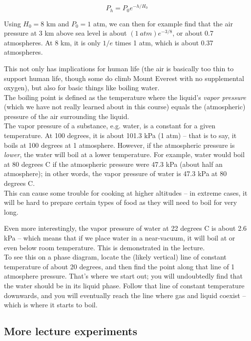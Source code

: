 \documentclass[8.01x]{subfiles}
\begin{document}
\begin{equation}
P_h = P_0 e^{- h/H_0}
\end{equation}

Using $H_0 = 8$ km and $P_0 = 1$ atm, we can then for example find that the air pressure at 3 km above sea level is about $(\SI{1}{atm})e^{-3/8}$, or about 0.7 atmospheres. At 8 km, it is only $1/e$ times 1 atm, which is about 0.37 atmospheres.

This not only has implications for human life (the air is basically too thin to support human life, though some do climb Mount Everest with no supplemental oxygen), but also for basic things like boiling water.\\
The boiling point is defined as the temperature where the liquid's \emph{vapor pressure} (which we have not really learned about in this course) equals the (atmospheric) pressure of the air surrounding the liquid.\\
The vapor pressure of a substance, e.g. water, is a constant for a given temperature. At 100 degrees, it is about 101.3 kPa (1 atm) -- that is to say, it boils at 100 degrees at 1 atmosphere. However, if the atmospheric pressure is \emph{lower}, the water will boil at a lower temperature. For example, water would boil at 80 degrees C if the atmospheric pressure were 47.3 kPa (about half an atmosphere); in other words, the vapor pressure of water is 47.3 kPa at 80 degrees C.\\
This can cause some trouble for cooking at higher altitudes -- in extreme cases, it will be hard to prepare certain types of food as they will need to boil for very long.

Even more interestingly, the vapor pressure of water at 22 degrees C is about 2.6 kPa -- which means that if we place water in a near-vacuum, it will boil at or even below room temperature. This is demonstrated in the lecture.\\
To see this on a phase diagram, locate the (likely vertical) line of constant temperature of about 20 degrees, and then find the point along that line of 1 atmosphere pressure. That's where we start out; you will undoubtedly find that the water should be in its liquid phase. Follow that line of constant temperature downwards, and you will eventually reach the line where gas and liquid coexist -- which is where it starts to boil.

\subsection{More lecture experiments}
\end{document}
